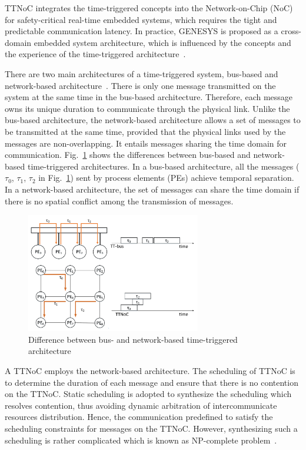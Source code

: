 \documentclass[journal]{IEEEtran}
\theoremstyle{remark}
\begin{document}
TTNoC integrates the time-triggered concepts into the Network-on-Chip (NoC) for safety-critical real-time embedded systems, which requires the tight and predictable communication latency.
In practice,
 GENESYS is proposed as a cross-domain embedded system architecture,
  which is influenced by the concepts and the experience of the time-triggered architecture~\cite{DBLP:conf/ladc/Kopetz11}.

There are two main architectures of a time-triggered system,
 bus-based and network-based architecture~\cite{DBLP:conf/date/HuangBRBK12}.
There is only one message transmitted on the system at the same time in the bus-based architecture. 
Therefore,
 each message owns its unique duration to communicate through the physical link.
Unlike the bus-based architecture,
 the network-based architecture allows a set of messages to be transmitted at the same time,
 provided that the physical links used by the messages are non-overlapping.
It entails messages sharing the time domain for communication.
Fig.~\ref{f:diff} shows the differences between bus-based and network-based time-triggered architectures.
In a bus-based architecture,
 all the messages ($\tau_0$, $\tau_1$, $\tau_2$ in Fig.~\ref{f:diff}) sent by process elements (PEs) achieve temporal separation. 
In a network-based architecture,
 the set of messages can share the time domain if there is no spatial conflict among the transmission of messages.
\begin{figure}[!t]
	\centering
	\includegraphics[width=3in]{picture/difference.pdf}
	\caption{Difference between bus- and network-based time-triggered architecture}
	\label{f:diff}
\end{figure}

A TTNoC employs the network-based architecture.
The scheduling of TTNoC is to determine the duration of each message and ensure that there is no contention on the TTNoC. 
Static scheduling is adopted to synthesize the scheduling which resolves contention,
thus avoiding dynamic arbitration of intercommunicate resources distribution. 
Hence, the communication predefined to satisfy the scheduling constraints for messages on the TTNoC.
However,
 synthesizing such a scheduling is rather complicated which is known as NP-complete problem~\cite{DBLP:conf/date/HuangBRBK12,DBLP:conf/rtss/Steiner10}.
\end{document}

